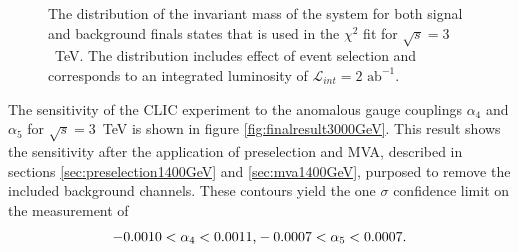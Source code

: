 \begin{figure}[h!]
\centering
{}
\caption[The distribution of the invariant mass of the system for both signal and background finals states that is used in the $\chi^{2}$ fit for $\sqrt{s}=3$~TeV.  The distribution includes effect of event selection and corresponds to an integrated luminosity of $\mathcal{L}_{int} = 2\text{ ab}^{-1}$.]{The distribution of the invariant mass of the system for both signal and background finals states that is used in the $\chi^{2}$ fit for $\sqrt{s}=3$~TeV.  The distribution includes effect of event selection and corresponds to an integrated luminosity of $\mathcal{L}_{int} = 2\text{ ab}^{-1}$.}
\label{fig:signalbackgroundfit3000}
\end{figure}

The sensitivity of the CLIC experiment to the anomalous gauge couplings $\alpha_{4}$ and $\alpha_{5}$ for $\sqrt{s}=3$~TeV is shown in figure \ref{fig:finalresult3000GeV}.  This result shows the sensitivity after the application of preselection and MVA, described in sections \ref{sec:preselection1400GeV} and \ref{sec:mva1400GeV}, purposed to remove the included background channels.  These contours yield the one $\sigma$ confidence limit on the measurement of 
%
\begin{equation}
-0.0010 < \alpha_{4} < 0.0011 \text{,} \\
-0.0007 < \alpha_{5} < 0.0007 \text{.}
\end{equation}
%

